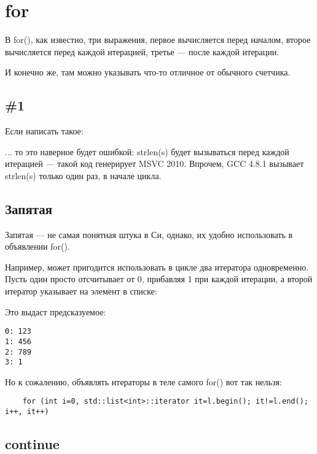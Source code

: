 ﻿\section{for}

В for(), как известно, три выражения, первое вычисляется перед началом, второе вычисляется перед каждой итерацией, третье --- после каждой итерации.

И конечно же, там можно указывать что-то отличное от обычного счетчика.

\subsection{ \#1}

Если написать такое:



... то это наверное будет ошибкой: strlen(s) будет вызываться перед каждой итерацией --- такой код генерирует
MSVC 2010. Впрочем, GCC 4.8.1 вызывает strlen(s) только один раз, в начале цикла.

\subsection{Запятая}

Запятая --- не самая понятная штука в Си, однако, их удобно использовать в объявлении for().

Например, может пригодится использовать в цикле два итератора одновременно. Пусть один просто отсчитывает
от 0, прибавляя 1 при каждой итерации, а второй итератор указывает на элемент в списке:



Это выдаст предсказуемое:

\begin{lstlisting}
0: 123
1: 456
2: 789
3: 1
\end{lstlisting}

Но к сожалению, объявлять итераторы в теле самого for() вот так нельзя:

\begin{lstlisting}
	for (int i=0, std::list<int>::iterator it=l.begin(); it!=l.end(); i++, it++)
\end{lstlisting}

\subsection{continue}

